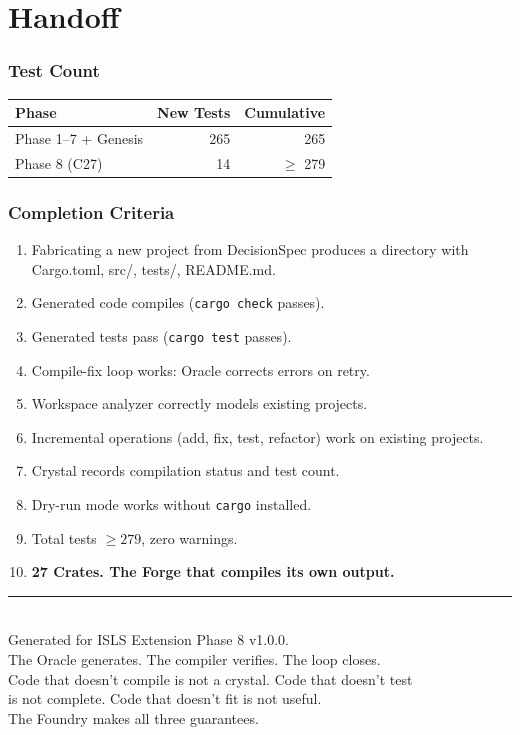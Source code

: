 \documentclass[11pt,a4paper,twoside]{article}
\theoremstyle{definition}
\theoremstyle{plain}
\theoremstyle{remark}
\newcommand{\ISLS}{\textsf{ISLS}}
\begin{document}
\part{Handoff}\label{part:handoff}

\section{Test Count}

\begin{tabular}{l r r}
\toprule
\textbf{Phase} & \textbf{New Tests} & \textbf{Cumulative} \\
\midrule
Phase 1--7 + Genesis & 265 & 265 \\
Phase 8 (C27) & 14 & $\ge$ 279 \\
\bottomrule
\end{tabular}

\section{Completion Criteria}

\begin{enumerate}[nosep]
  \item Fabricating a new project from DecisionSpec produces a
        directory with Cargo.toml, src/, tests/, README.md.
  \item Generated code compiles (\texttt{cargo check} passes).
  \item Generated tests pass (\texttt{cargo test} passes).
  \item Compile-fix loop works: Oracle corrects errors on retry.
  \item Workspace analyzer correctly models existing projects.
  \item Incremental operations (add, fix, test, refactor) work
        on existing projects.
  \item Crystal records compilation status and test count.
  \item Dry-run mode works without \texttt{cargo} installed.
  \item Total tests $\ge 279$, zero warnings.
  \item \textbf{27 Crates. The Forge that compiles its own output.}
\end{enumerate}


\vfill
\begin{center}
\rule{0.5\textwidth}{0.4pt}\\[0.5cm]
{\small Generated for \ISLS{} Extension Phase 8 v1.0.0.\\
The Oracle generates. The compiler verifies. The loop closes.\\
Code that doesn't compile is not a crystal. Code that doesn't test\\
is not complete. Code that doesn't fit is not useful.\\[0.3cm]
The Foundry makes all three guarantees.}
\end{center}
\end{document}
